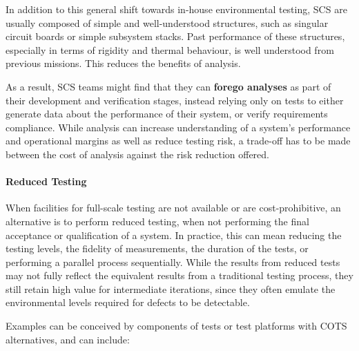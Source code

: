 \documentclass[a4paper,nobib,justified,final]{tufte-book}
\begin{document}
In addition to this general shift towards in-house environmental testing, \ac{SCS} are usually composed of simple and well-understood structures, such as singular circuit boards or simple subsystem stacks. Past performance of these structures, especially in terms of rigidity and thermal behaviour, is well understood from previous missions. This reduces the benefits of analysis.

As a result, \ac{SCS} teams might find that they can \textbf{forego analyses} as part of their development and verification stages, instead relying only on tests to either generate data about the performance of their system, or verify requirements compliance. While analysis can increase understanding of a system's performance and operational margins as well as reduce testing risk, a trade-off has to be made between the cost of analysis against the risk reduction offered.


\paragraph{Reduced Testing}

When facilities for full-scale testing are not available or are cost-prohibitive, an alternative is to perform reduced testing, when not performing the final acceptance or qualification of a system. In practice, this can mean reducing the testing levels, the fidelity of measurements, the duration of the tests, or performing a parallel process sequentially. While the results from reduced tests may not fully reflect the equivalent results from a traditional testing process, they still retain high value for intermediate iterations, since they often emulate the environmental levels required for defects to be detectable.

Examples can be conceived by components of tests or test platforms with \acs{COTS} alternatives, and can include:
\end{document}
